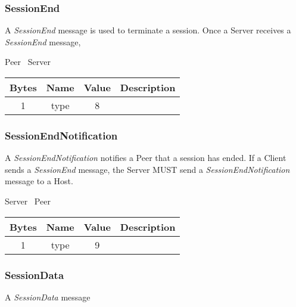 \documentclass{article}
\begin{document}
    \subsubsection{SessionEnd}

    A \emph{SessionEnd} message is used to terminate a session. Once a Server receives a \emph{SessionEnd} message,

    \begin{center}
        Peer \textrightarrow\ Server\\
        \begin{tabular}{|c|c|c|c|}
            \hline
            \textbf{Bytes} & \textbf{Name} & \textbf{Value} & \textbf{Description} \\
            \hline
            1              & type          & 8              &                      \\
            \hline
        \end{tabular}
    \end{center}

    \subsubsection{SessionEndNotification}

    A \emph{SessionEndNotification} notifies a Peer that a session has ended. If a Client sends a \emph{SessionEnd}
    message, the Server MUST send a \emph{SessionEndNotification} message to a Host.

    \begin{center}
        Server \textrightarrow\ Peer\\
        \begin{tabular}{|c|c|c|c|}
            \hline
            \textbf{Bytes} & \textbf{Name} & \textbf{Value} & \textbf{Description} \\
            \hline
            1              & type          & 9              &                      \\
            \hline
        \end{tabular}
    \end{center}

    \subsubsection{SessionData}

    A \emph{SessionData} message

    \newpage
\end{document}
